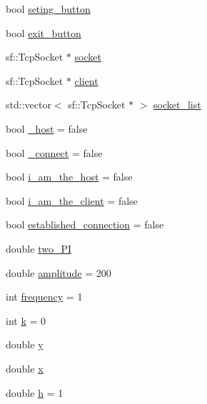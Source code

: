 \begin{DoxyCompactItemize}
\item 
bool \hyperlink{classSekander_1_1MainMenuState_a5ebf1c8d29ebdea2c6f527e0f37929c1}{seting\+\_\+button}
\item 
bool \hyperlink{classSekander_1_1MainMenuState_a96d6929e4627393d278b955fd1de5d33}{exit\+\_\+button}
\item 
sf\+::\+Tcp\+Socket $\ast$ \hyperlink{classSekander_1_1MainMenuState_a3f5905df121c601a8e818d2eab62ba6b}{socket}
\item 
sf\+::\+Tcp\+Socket $\ast$ \hyperlink{classSekander_1_1MainMenuState_a62fcd2f99962a03992e2858dc4765d89}{client}
\item 
std\+::vector$<$ sf\+::\+Tcp\+Socket $\ast$ $>$ \hyperlink{classSekander_1_1MainMenuState_a7159a331d12d28479ee65786f7c93bc1}{socket\+\_\+list}
\item 
bool \hyperlink{classSekander_1_1MainMenuState_a3162344a57f59cc489ed9caba2863bf1}{\+\_\+host} = false
\item 
bool \hyperlink{classSekander_1_1MainMenuState_aee9956c65e169ef75ccb46022d4785cb}{\+\_\+connect} = false
\item 
bool \hyperlink{classSekander_1_1MainMenuState_a32c8906cd8fadf7605bcda2179d2c19f}{i\+\_\+am\+\_\+the\+\_\+host} = false
\item 
bool \hyperlink{classSekander_1_1MainMenuState_ac844479292f860e487a2b24d447dd6dc}{i\+\_\+am\+\_\+the\+\_\+client} = false
\item 
bool \hyperlink{classSekander_1_1MainMenuState_ab8863f0722718dd1331d7f5a11c0a5fe}{established\+\_\+connection} = false
\item 
double \hyperlink{classSekander_1_1MainMenuState_afe1fb61b370c0c2e437af904d2529012}{two\+\_\+\+PI}
\item 
double \hyperlink{classSekander_1_1MainMenuState_ac958e893ea737c7940d313d6c85d4f97}{amplitude} = 200
\item 
int \hyperlink{classSekander_1_1MainMenuState_ad598c82514f10a946507387748488e92}{frequency} = 1
\item 
int \hyperlink{classSekander_1_1MainMenuState_a0ecd1f7e9110bd75c802497ff59e2220}{k} = 0
\item 
double \hyperlink{classSekander_1_1MainMenuState_a863c7ceaeacacb0176b025aacc2ac4dc}{y}
\item 
double \hyperlink{classSekander_1_1MainMenuState_a8f252e97a1df6804381dd900ec16d9ba}{x}
\item 
double \hyperlink{classSekander_1_1MainMenuState_a66dfd5262c9d2248e4dd4028b4a1b59e}{h} = 1
\item 

\end{DoxyCompactItemize}
